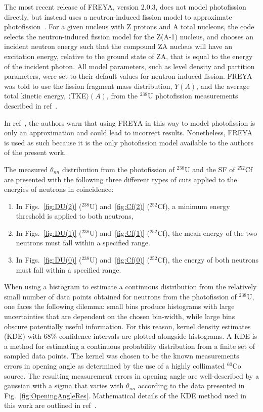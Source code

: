 The most recent release of FREYA, version 2.0.3, does not model photofission directly, but instead uses a neutron-induced fission model to approximate photofission~\cite{FREYA_photofission}.
For a given nucleus with Z protons and A total nucleons, the code selects the neutron-induced fission model for the Z(A-1) nucleus, and chooses an incident neutron energy such that the compound ZA nucleus will have an excitation energy, relative to the ground state of ZA, that is equal to the energy of the incident photon.
All model parameters, such as level density and partition parameters, were set to their default values for neutron-induced fission.
FREYA was told to use the fission fragment mass distribution, $Y(A)$, and the average total kinetic energy, $\langle$TKE$\rangle(A)$, from the $^{238}$U photofission measurements described in ref~\cite{2017Krishichayan}.

In ref~\cite{Talou2018}, the authors warn that using FREYA in this way to model photofission is only an approximation and could lead to incorrect results.
Nonetheless, FREYA is used as such because it is the only photofission model available to the authors of the present work.

The measured $\theta_{nn}$ distribution from the photofission of $^{238}$U and the SF of $^{252}$Cf are presented with the following three different types of cuts applied to the energies of neutrons in coincidence:
\begin{enumerate}[label=(\roman*), itemjoin={{, }}, itemjoin*={{, or }}]
    \item In Figs.~\ref{fig:DU(2)} ($^{238}$U) and~\ref{fig:Cf(2)} ($^{252}$Cf), a minimum energy threshold is applied to both neutrons,   \item In Figs.~\ref{fig:DU(1)} ($^{238}$U) and~\ref{fig:Cf(1)} ($^{252}$Cf), the mean energy of the two neutrons must fall within a specified range.   
  \item In Figs.~\ref{fig:DU(0)} ($^{238}$U) and~\ref{fig:Cf(0)} ($^{252}$Cf), the energy of both neutrons must fall within a specified range.
  \end{enumerate}

When using a histogram to estimate a continuous distribution from the relatively small number of data points obtained for neutrons from the photofission of $^{238}$U, one faces the following dilemma: small bins produce histograms with large uncertainties that are dependent on the chosen bin-width, while large bins obscure potentially useful information. 
For this reason, kernel density estimates (KDE) with 68\% confidence intervals are plotted alongside histograms.
A KDE is a method for estimating a continuous probability distribution from a finite set of sampled data points.
The kernel was chosen to be the known measurements errors in opening angle as determined by the use of a highly collimated $^{60}$Co source.
The resulting measurement errors in opening angle are well-described by a gaussian with a sigma that varies with $\theta_{nn}$ according to the data presented in Fig.~\ref{fig:OpeningAngleRes}.
Mathematical details of the KDE method used in this work are outlined in ref~\cite{KDE}. 

